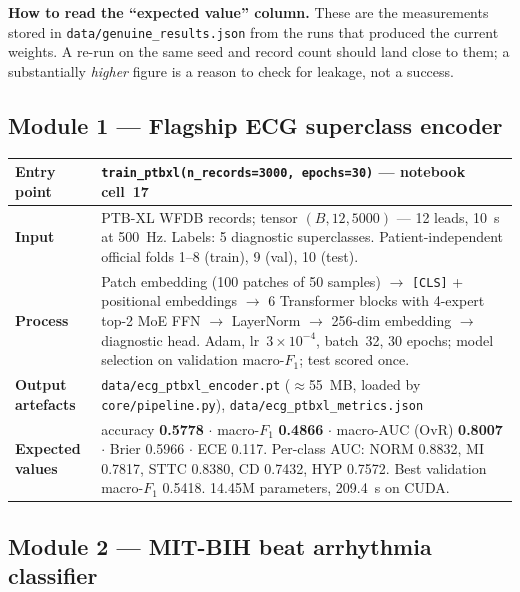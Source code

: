 \documentclass[11pt,a4paper]{article}
\newcommand{\code}[1]{\texttt{\small #1}}
\begin{document}
\begin{notebox}
\textbf{How to read the ``expected value'' column.} These are the
measurements stored in \code{data/genuine\_results.json} from the runs
that produced the current weights. A re-run on the same seed and record
count should land close to them; a substantially \emph{higher} figure is a
reason to check for leakage, not a success.
\end{notebox}

\subsection{Module 1 --- Flagship ECG superclass encoder}

\begin{table}[!ht]
\centering
\small
\begin{tabular}{@{}p{2.4cm}p{12.4cm}@{}}
\toprule
\textbf{Entry point} & \code{train\_ptbxl(n\_records=3000, epochs=30)}
--- notebook cell~17\\
\midrule
\textbf{Input} & PTB-XL WFDB records; tensor $(B, 12, 5000)$ --- 12 leads,
10~s at 500~Hz. Labels: 5 diagnostic superclasses. Patient-independent
official folds 1--8 (train), 9 (val), 10 (test).\\
\addlinespace
\textbf{Process} & Patch embedding (100 patches of 50 samples)
$\rightarrow$ \code{[CLS]} + positional embeddings $\rightarrow$ 6
Transformer blocks with 4-expert top-2 MoE FFN $\rightarrow$ LayerNorm
$\rightarrow$ 256-dim embedding $\rightarrow$ diagnostic head. Adam,
lr~$3\times10^{-4}$, batch~32, 30 epochs; model selection on validation
macro-$F_1$; test scored once.\\
\addlinespace
\textbf{Output artefacts} & \code{data/ecg\_ptbxl\_encoder.pt} ($\approx$55~MB,
loaded by \code{core/pipeline.py}), \code{data/ecg\_ptbxl\_metrics.json}\\
\addlinespace
\textbf{Expected values} &
accuracy \textbf{0.5778} $\cdot$ macro-$F_1$ \textbf{0.4866} $\cdot$
macro-AUC (OvR) \textbf{0.8007} $\cdot$ Brier 0.5966 $\cdot$ ECE 0.117.
Per-class AUC: NORM 0.8832, MI 0.7817, STTC 0.8380, CD 0.7432, HYP 0.7572.
Best validation macro-$F_1$ 0.5418. 14.45M parameters, 209.4~s on CUDA.\\
\bottomrule
\end{tabular}
\end{table}

\subsection{Module 2 --- MIT-BIH beat arrhythmia classifier}
\end{document}
